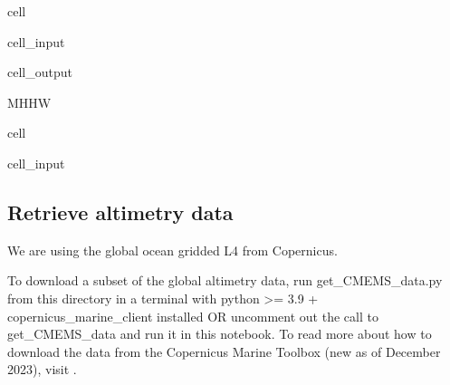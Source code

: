 \documentclass[letterpaper,10pt,english]{jupyterBook}
\begin{document}
\begin{sphinxuseclass}{cell}
\begin{sphinxVerbatimInput}
\begin{sphinxuseclass}{cell_input}
\end{sphinxuseclass}\end{sphinxVerbatimInput}
\begin{sphinxVerbatimOutput}

\begin{sphinxuseclass}{cell_output}
\begin{sphinxVerbatim}[commandchars=\\\{\}]
\PYGZsq{}MHHW\PYGZsq{}
\end{sphinxVerbatim}

\end{sphinxuseclass}\end{sphinxVerbatimOutput}

\end{sphinxuseclass}
\begin{sphinxuseclass}{cell}\begin{sphinxVerbatimInput}

\begin{sphinxuseclass}{cell_input}
\begin{sphinxVerbatim}[commandchars=\\\{\}]
  
\end{sphinxVerbatim}

\end{sphinxuseclass}\end{sphinxVerbatimInput}

\end{sphinxuseclass}

\subsection{Retrieve altimetry data}
\label{\detokenize{notebooks/SL_Data_Wrangling:retrieve-altimetry-data}}
\sphinxAtStartPar
We are using the global ocean gridded L4  from Copernicus.

\sphinxAtStartPar
To download a subset of the global altimetry data, run get\_CMEMS\_data.py from this directory in a terminal with python >= 3.9 + copernicus\_marine\_client installed OR uncomment out the call to get\_CMEMS\_data and run it in this notebook. To read more about how to download the data from the Copernicus Marine Toolbox (new as of December 2023), visit .
\end{document}
